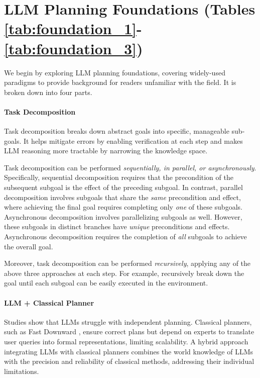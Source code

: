 \section{LLM Planning Foundations (Tables \ref{tab:foundation_1}-\ref{tab:foundation_3})} \label{sec:foundations} 

We begin by exploring LLM planning foundations, covering widely-used paradigms to provide background for readers unfamiliar with the field. It is broken down into four parts.

\vspace{-0.1in}
\paragraph{Task Decomposition} Task decomposition breaks down abstract goals into specific, manageable sub-goals. It helps mitigate errors by enabling verification at each step and makes LLM reasoning more tractable by narrowing the knowledge space.

Task decomposition can be performed \emph{sequentially, in parallel, or asynchronously}. Specifically, sequential decomposition \cite{wang2023describe, singh2023progprompt, sun2024adaplanner, wu2024can} 
requires that the precondition of the subsequent subgoal is the effect of the preceding subgoal. 
In contrast, parallel decomposition \cite{yang2024selfgoal} involves subgoals that share the \emph{same} precondition and effect, where achieving the final goal requires completing only \emph{one} of these subgoals. Asynchronous decomposition \cite{lin2024graph} involves parallelizing subgoals as well. However, these subgoals in distinct branches have \emph{unique} preconditions and effects. Asynchronous decomposition requires the completion of \emph{all} subgoals to achieve the overall goal. 

Moreover, task decomposition can be performed \emph{recursively}, applying any of the above three approaches at each step. For example, \citet{prasad2023adapt} recursively break down the goal until each subgoal can be easily executed in the environment.  

\vspace{-0.1in}
\paragraph{LLM + Classical Planner} Studies \cite{valmeekam2023planning, kambhampati2024can, kambhampati2024llms} show that LLMs struggle with independent planning. Classical planners, such as Fast Downward \cite{helmert2006fast}, ensure correct plans but depend on experts to translate user queries into formal representations, limiting scalability. A hybrid approach integrating LLMs with classical planners combines the world knowledge of LLMs with the precision and reliability of classical methods, addressing their individual limitations.

